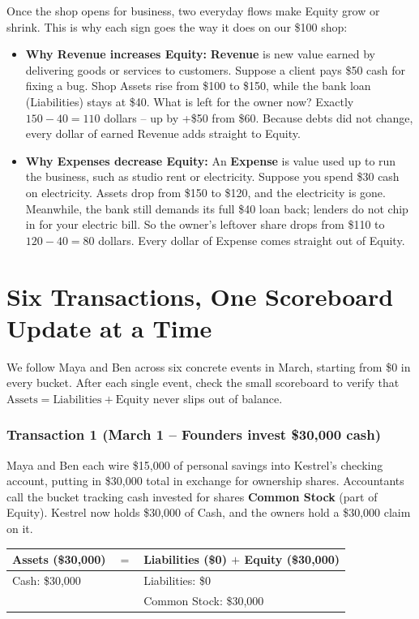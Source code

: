 Once the shop opens for business, two everyday flows make Equity grow or shrink. This is why each sign goes the way it does on our \$100 shop:
\begin{itemize}
  \item \textbf{Why Revenue increases Equity:} \textbf{Revenue} is new value earned by delivering goods or services to customers. Suppose a client pays \$50 cash for fixing a bug. Shop Assets rise from \$100 to \$150, while the bank loan (Liabilities) stays at \$40. What is left for the owner now? Exactly $150 - 40 = 110$ dollars -- up by +\$50 from \$60. Because debts did not change, every dollar of earned Revenue adds straight to Equity.
  \item \textbf{Why Expenses decrease Equity:} An \textbf{Expense} is value used up to run the business, such as studio rent or electricity. Suppose you spend \$30 cash on electricity. Assets drop from \$150 to \$120, and the electricity is gone. Meanwhile, the bank still demands its full \$40 loan back; lenders do not chip in for your electric bill. So the owner's leftover share drops from \$110 to $120 - 40 = 80$ dollars. Every dollar of Expense comes straight out of Equity.
\end{itemize}

\section{Six Transactions, One Scoreboard Update at a Time}

We follow Maya and Ben across six concrete events in March, starting from \$0 in every bucket. After each single event, check the small scoreboard to verify that $\text{Assets} = \text{Liabilities} + \text{Equity}$ never slips out of balance.

\subsubsection*{Transaction 1 (March 1 -- Founders invest \$30,000 cash)}
Maya and Ben each wire \$15,000 of personal savings into Kestrel's checking account, putting in \$30,000 total in exchange for ownership shares. Accountants call the bucket tracking cash invested for shares \textbf{Common Stock} (part of Equity). Kestrel now holds \$30,000 of Cash, and the owners hold a \$30,000 claim on it.

\begin{center}
\small
\begin{tabular}{@{}lcl@{}}
\toprule
\textbf{Assets (\$30,000)} & $=$ & \textbf{Liabilities (\$0) $+$ Equity (\$30,000)} \\
\midrule
Cash: \$30,000 & & Liabilities: \$0 \\
               & & Common Stock: \$30,000 \\
\bottomrule
\end{tabular}
\end{center}


